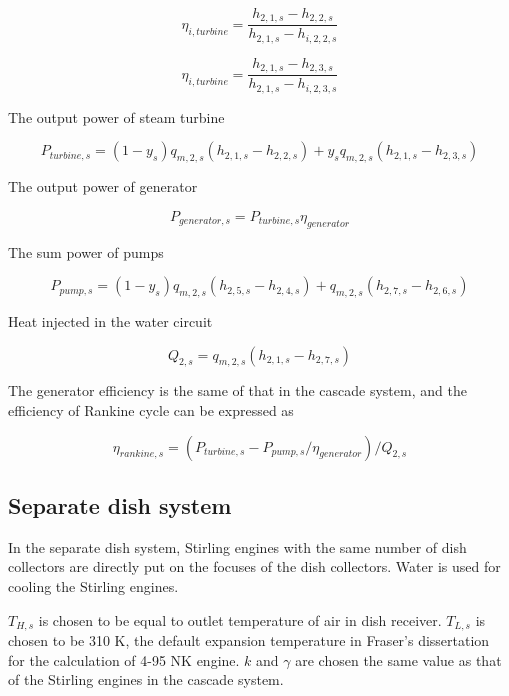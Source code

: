 \documentclass{article}
\begin{document}
\begin{equation*}
	\eta_{i,turbine}=\frac{h_{2,1,s}-h_{2,2,s}}{h_{2,1,s}-h_{i,2,2,s}}
\end{equation*}

\begin{equation*}
	\eta_{i,turbine}=\frac{h_{2,1,s}-h_{2,3,s}}{h_{2,1,s}-h_{i,2,3,s}}
\end{equation*}

The output power of steam turbine

\begin{equation*}
	P_{turbine,s}=\left(1-y_{s}\right)q_{m,2,s}\left(h_{2,1,s}-h_{2,2,s}\right)+y_{s}q_{m,2,s}\left(h_{2,1,s}-h_{2,3,s}\right)
\end{equation*}

The output power of generator

\begin{equation*}
	P_{generator,s}=P_{turbine,s}\eta_{generator}
\end{equation*}

The sum power of pumps

\begin{equation*}
	P_{pump,s}=\left(1-y_{s}\right)q_{m,2,s}\left(h_{2,5,s}-h_{2,4,s}\right)+q_{m,2,s}\left(h_{2,7,s}-h_{2,6,s}\right)
\end{equation*}

Heat injected in the water circuit

\begin{equation*}
	Q_{2,s}=q_{m,2,s}\left(h_{2,1,s}-h_{2,7,s}\right)
\end{equation*}

The generator efficiency is the same of that in the cascade system, and the efficiency of Rankine cycle can be expressed as

\begin{equation*}
	\eta_{rankine,s}=(P_{turbine,s}-P_{pump,s}/\eta_{generator})/Q_{2,s}
\end{equation*}

\subsection{Separate dish system}

In the separate dish system, Stirling engines with the same number of dish collectors are directly put on the focuses of the dish collectors. Water is used for cooling the Stirling engines.

$T_{H,s}$ is chosen to be equal to outlet temperature of air in dish receiver. $T_{L,s}$ is chosen to be 310 K, the default expansion temperature in Fraser's dissertation~\cite{Fraser2008} for the calculation of 4-95 NK\uppercase\expandafter{} engine. $k$ and $\gamma$ are chosen the same value as that of the Stirling engines in the cascade system.
\end{document}
